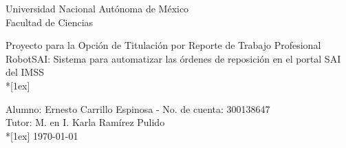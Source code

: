 \documentclass[a4paper,10pt]{article}
\begin{document}
\begin{center}
\begin{Large}
Universidad Nacional Autónoma de México\\
Facultad de Ciencias\\
\end{Large}
\begin{LARGE}
Proyecto para la Opción de Titulación por Reporte de Trabajo Profesional\\
RobotSAI: Sistema para automatizar las órdenes de reposición en el portal SAI del IMSS\\*[1ex]
\end{LARGE}

Alumno: Ernesto Carrillo Espinosa - No. de cuenta: 300138647\\
Tutor: M. en I. Karla Ramírez Pulido\\*[1ex]
\today
\end{center}
\end{document}
